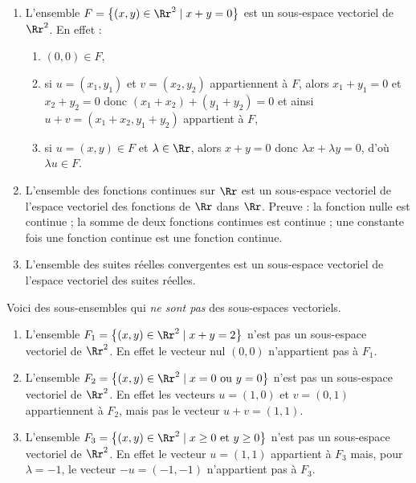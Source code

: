 \documentclass[class=report,crop=false]{standalone}
\begin{document}
\begin{exemple}
\sauteligne
\begin{enumerate}
  \item L'ensemble $F=\big\{(x,y)\in \Rr^2\mid x+y=0\big\}$  est un sous-espace
  vectoriel de $\Rr^2$. En effet :
  \begin{enumerate}
    \item $(0,0) \in F$,

    \item si $u=(x_1,y_1)$ et $v=(x_2,y_2)$ appartiennent à $F$, alors
    $x_1+y_1=0$ et $x_2+y_2=0$ donc $(x_1+x_2)+(y_1+y_2)=0$ et ainsi $u+v=(x_1+x_2,y_1+y_2)$ appartient à $F$,

    \item si $u=(x,y) \in F$ et $\lambda \in \Rr$, alors $x+y=0$ donc $\lambda x + \lambda y = 0$,
    d'où $\lambda u \in F$.
  \end{enumerate}


  \item L'ensemble des fonctions continues sur $\Rr$ est un sous-espace vectoriel
  de l'espace vectoriel des fonctions de $\Rr$ dans $\Rr$. Preuve :
  la fonction nulle est continue ;
  la somme de deux fonctions continues est continue ;
  une constante fois une fonction continue est
  une fonction continue.

  \item L'ensemble des suites réelles convergentes est un
  sous-espace vectoriel de l'espace vectoriel des suites réelles.
\end{enumerate}
\end{exemple}

Voici des sous-ensembles qui \emph{ne sont pas} des sous-espaces vectoriels.
\begin{exemple}
\sauteligne
\begin{enumerate}
   \item L'ensemble $F_1=\big\{(x,y)\in \Rr^2\mid x+y=2\big\}$ n'est pas un sous-espace vectoriel de $\Rr^2$.
  En effet le vecteur nul $(0,0)$ n'appartient pas à $F_1$.

   \item L'ensemble $F_2=\big\{(x,y)\in \Rr^2\mid x=0 \text{ ou } y=0 \big\}$ n'est pas un sous-espace vectoriel de $\Rr^2$.
  En effet les vecteurs $u=(1,0)$ et $v=(0,1)$ appartiennent à $F_2$, mais pas le vecteur $u+v=(1,1)$.

   \item L'ensemble $F_3=\big\{(x,y)\in \Rr^2\mid x \ge 0 \text{ et } y\ge 0\big\}$ n'est pas un sous-espace vectoriel de $\Rr^2$.
  En effet le vecteur $u=(1,1)$ appartient à $F_3$ mais, pour $\lambda = -1$, le vecteur $-u = (-1,-1)$ n'appartient pas à $F_3$.
\end{enumerate}
\end{exemple}
\end{document}

